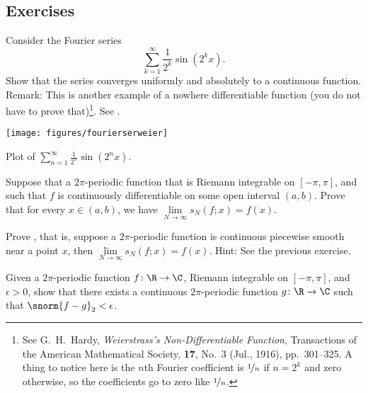 \subsection{Exercises}

\begin{exercise} \label{exercise:fsweierser}
Consider the Fourier series
\begin{equation*}
\sum_{k=1}^\infty \frac{1}{2^k} \sin(2^k x) .
\end{equation*}
Show that the series converges uniformly and absolutely to a continuous
function.  Remark: This is another example of a nowhere differentiable
function (you do not have to prove that)\footnote{%
See
G.\ H.\ Hardy, \emph{Weierstrass's Non-Differentiable Function},
Transactions of the American Mathematical Society,
\textbf{17}, No.\ 3 (Jul., 1916), pp.\ 301--325.
A thing to notice here is the $n$th Fourier coefficient is $\nicefrac{1}{n}$
if $n=2^k$ and zero otherwise, so the coefficients go to zero like
$\nicefrac{1}{n}$.}.
See .
\begin{myfigureht}
\texttt{[image: figures/fourierserweier]}
\caption{Plot of 
$\sum_{n=1}^\infty \frac{1}{2^n} \sin(2^n x)$.\label{fig:fourierserweier}}
\end{myfigureht}
\end{exercise}

\begin{exercise}
Suppose that a $2\pi$-periodic function that is Riemann integrable
on $[-\pi,\pi]$, and such that $f$ is continuously differentiable
on some open interval $(a,b)$.  Prove that
for every $x \in (a,b)$, we have $\lim\limits_{N\to\infty} s_N(f;x) = f(x)$.
\end{exercise}

\begin{exercise}
Prove , that is,
suppose a $2\pi$-periodic function is continuous piecewise
smooth near a point $x$, then $\lim\limits_{N\to\infty} s_N(f;x) = f(x)$.  Hint: See the previous
exercise.
\end{exercise}

\begin{exercise} \label{exercise:contL2close}
Given a $2\pi$-periodic function $f \colon \R \to \C$, Riemann integrable on
$[-\pi,\pi]$,
and $\epsilon > 0$,
show that there exists a continuous $2\pi$-periodic function $g \colon \R
\to \C$ such that $\snorm{f-g}_2 < \epsilon$.
\end{exercise}

